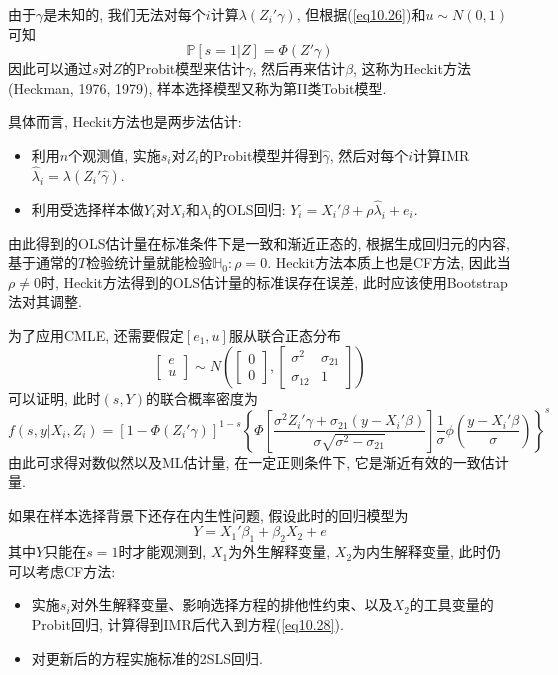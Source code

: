 \documentclass[cn, 12pt, math=mtpro2, bibstyle=apa, blue, twocol]{elegantbook}
\newcommand{\PP}{\mathbb{P}}
\newcommand{\HH}{\mathbb{H}}
\begin{document}
由于$\gamma$是未知的, 我们无法对每个$i$计算$\lambda(Z_i'\gamma)$, 但根据(\ref{eq10.26})和$u\sim N(0,1)$可知
$$\PP[s=1|Z]=\Phi(Z'\gamma)$$
因此可以通过$s$对$Z$的Probit模型来估计$\gamma$, 然后再来估计$\beta$, 这称为Heckit方法 (Heckman, 1976, 1979), 样本选择模型又称为第II类Tobit模型.

具体而言, Heckit方法也是两步法估计:
\begin{itemize}
  \item 利用$n$个观测值, 实施$s_i$对$Z_i$的Probit模型并得到$\hat{\gamma}$, 然后对每个$i$计算IMR $\hat{\lambda}_i=\lambda(Z_i'\hat{\gamma})$.
  \item 利用受选择样本做$Y_i$对$X_i$和$\lambda_i$的OLS回归: $Y_i=X_i'\beta+\rho\hat{\lambda}_i+e_i$.
\end{itemize}
由此得到的OLS估计量在标准条件下是一致和渐近正态的, 根据生成回归元的内容, 基于通常的$T$检验统计量就能检验$\HH_0:\rho=0$. Heckit方法本质上也是CF方法, 因此当$\rho\neq0$时, Heckit方法得到的OLS估计量的标准误存在误差, 此时应该使用Bootstrap法对其调整.

为了应用CMLE, 还需要假定$[e_1,u]$服从联合正态分布
$$\begin{bmatrix}
    e \\
    u
  \end{bmatrix}\sim N\left(\begin{bmatrix}
                                    0 \\
                                    0
                                  \end{bmatrix},\begin{bmatrix}
                                                  \sigma^2 & \sigma_{21} \\
                                                  \sigma_{12} & 1
                                                \end{bmatrix}\right)$$
可以证明, 此时$(s,Y)$的联合概率密度为
$$f(s,y|X_i,Z_i)=[1-\Phi(Z_i'\gamma)]^{1-s}\left\{\Phi\left[\frac{\sigma^2Z_i'\gamma+\sigma_{21}(y-X_i'\beta)}{\sigma\sqrt{\sigma^2-\sigma_{21}}}\right]\frac{1}{\sigma}\phi\left(\frac{y-X_i'\beta}{\sigma}\right) \right\}^s$$
由此可求得对数似然以及ML估计量, 在一定正则条件下, 它是渐近有效的一致估计量.

如果在样本选择背景下还存在内生性问题, 假设此时的回归模型为
\begin{equation}\label{eq10.28}
  Y=X_1'\beta_1+\beta_2X_2+e
\end{equation}
其中$Y$只能在$s=1$时才能观测到, $X_1$为外生解释变量, $X_2$为内生解释变量, 此时仍可以考虑CF方法:
\begin{itemize}
  \item 实施$s_i$对外生解释变量、影响选择方程的排他性约束、以及$X_2$的工具变量的Probit回归, 计算得到IMR后代入到方程(\ref{eq10.28}).
  \item 对更新后的方程实施标准的2SLS回归.
\end{itemize}
\end{document}
